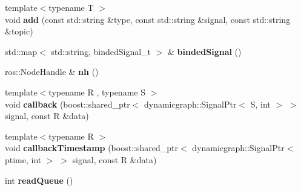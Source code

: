 \begin{DoxyCompactItemize}
\item 
{\footnotesize template$<$typename T $>$ }\\void {\bfseries add} (const std\+::string \&type, const std\+::string \&signal, const std\+::string \&topic)\hypertarget{classdynamic__graph_1_1RosQueuedSubscribe_ad676b92e3c68923c36e0794df9a36b07}{}\label{classdynamic__graph_1_1RosQueuedSubscribe_ad676b92e3c68923c36e0794df9a36b07}

\item 
std\+::map$<$ std\+::string, binded\+Signal\+\_\+t $>$ \& {\bfseries binded\+Signal} ()\hypertarget{classdynamic__graph_1_1RosQueuedSubscribe_ab6a37292689cb3798d9348561a2b6796}{}\label{classdynamic__graph_1_1RosQueuedSubscribe_ab6a37292689cb3798d9348561a2b6796}

\item 
ros\+::\+Node\+Handle \& {\bfseries nh} ()\hypertarget{classdynamic__graph_1_1RosQueuedSubscribe_a2e5ddc40978683c8c5ee5e1a6758aa22}{}\label{classdynamic__graph_1_1RosQueuedSubscribe_a2e5ddc40978683c8c5ee5e1a6758aa22}

\item 
{\footnotesize template$<$typename R , typename S $>$ }\\void {\bfseries callback} (boost\+::shared\+\_\+ptr$<$ dynamicgraph\+::\+Signal\+Ptr$<$ S, int $>$ $>$ signal, const R \&data)\hypertarget{classdynamic__graph_1_1RosQueuedSubscribe_afe57f995f66aa7bbf5d006e876cdbd66}{}\label{classdynamic__graph_1_1RosQueuedSubscribe_afe57f995f66aa7bbf5d006e876cdbd66}

\item 
{\footnotesize template$<$typename R $>$ }\\void {\bfseries callback\+Timestamp} (boost\+::shared\+\_\+ptr$<$ dynamicgraph\+::\+Signal\+Ptr$<$ ptime, int $>$ $>$ signal, const R \&data)\hypertarget{classdynamic__graph_1_1RosQueuedSubscribe_acfb7c66275aa4680cf0c6b40edeabb9d}{}\label{classdynamic__graph_1_1RosQueuedSubscribe_acfb7c66275aa4680cf0c6b40edeabb9d}

\item 
int {\bfseries read\+Queue} ()\hypertarget{classdynamic__graph_1_1RosQueuedSubscribe_a274d716f1f8fdba71963dd04db0fefd4}{}\label{classdynamic__graph_1_1RosQueuedSubscribe_a274d716f1f8fdba71963dd04db0fefd4}

\end{DoxyCompactItemize}
